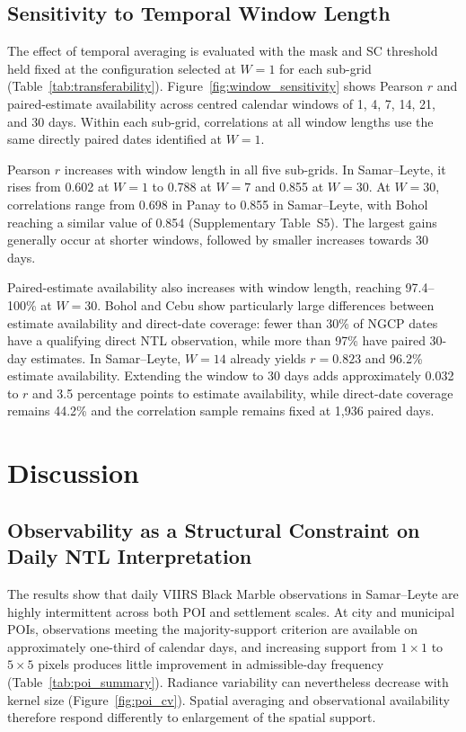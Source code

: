 \documentclass[]{interact}
\theoremstyle{plain}%
\theoremstyle{definition}
\theoremstyle{remark}
\begin{document}
    \subsection{Sensitivity to Temporal Window Length}
        
        The effect of temporal averaging is evaluated with the mask and SC threshold held fixed at the configuration selected at $W=1$ for each sub-grid (Table~\ref{tab:transferability}). Figure~\ref{fig:window_sensitivity} shows Pearson $r$ and paired-estimate availability across centred calendar windows of 1, 4, 7, 14, 21, and 30 days. Within each sub-grid, correlations at all window lengths use the same directly paired dates identified at $W=1$.
        
        Pearson $r$ increases with window length in all five sub-grids. In Samar--Leyte, it rises from 0.602 at $W=1$ to 0.788 at $W=7$ and 0.855 at $W=30$. At $W=30$, correlations range from 0.698 in Panay to 0.855 in Samar--Leyte, with Bohol reaching a similar value of 0.854 (Supplementary Table~S5). The largest gains generally occur at shorter windows, followed by smaller increases towards 30 days.
        
        Paired-estimate availability also increases with window length, reaching 97.4--100\% at $W=30$. Bohol and Cebu show particularly large differences between estimate availability and direct-date coverage: fewer than 30\% of NGCP dates have a qualifying direct NTL observation, while more than 97\% have paired 30-day estimates. In Samar--Leyte, $W=14$ already yields $r=0.823$ and 96.2\% estimate availability. Extending the window to 30 days adds approximately 0.032 to $r$ and 3.5 percentage points to estimate availability, while direct-date coverage remains 44.2\% and the correlation sample remains fixed at 1,936 paired days.

\section{Discussion}
    
    \subsection{Observability as a Structural Constraint on Daily NTL Interpretation}
    
        The results show that daily VIIRS Black Marble observations in Samar--Leyte are highly intermittent across both POI and settlement scales. At city and municipal POIs, observations meeting the majority-support criterion are available on approximately one-third of calendar days, and increasing support from $1\times1$ to $5\times5$ pixels produces little improvement in admissible-day frequency (Table~\ref{tab:poi_summary}). Radiance variability can nevertheless decrease with kernel size (Figure~\ref{fig:poi_cv}). Spatial averaging and observational availability therefore respond differently to enlargement of the spatial support.
        
\end{document}
